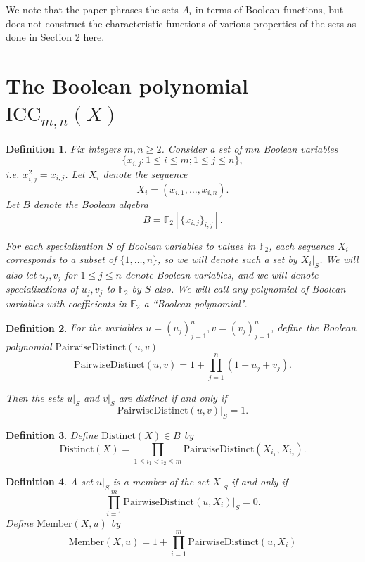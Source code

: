 \documentclass[11pt, oneside]{article}   	%
\newtheorem{definition}{Definition}
\begin{document}
We note that the paper \cite{Lozin} phrases the sets $A_i$ in terms of Boolean functions, but does not construct the characteristic functions of various properties of the sets as done in Section 2 here. 

\section{The Boolean polynomial $\mathrm{ICC}_{m,n}(X)$ }
\begin{definition} 
Fix integers $m,n \geq 2$. Consider a set of $mn$ Boolean variables $$\{x_{i,j} : 1 \leq i \leq m; 1 \leq j \leq n \},$$ i.e. $x_{i,j}^2 = x_{i,j}$. Let $X_i$ denote the sequence  
$$X_i = (x_{i,1}, \ldots, x_{i,n}).$$ 
Let $B$ denote the Boolean algebra $$B=\mathbb{F}_2[\{x_{i,j}\}_{i,j}] .$$


For each specialization $S$ of Boolean variables  to values in $\mathbb{F}_2$, each sequence $X_i$ corresponds to a subset of $\{ 1, \ldots, n\}$, so we will denote such a set by $X_i|_S$. We will also let $u_j, v_j$ for $1 \leq j  \leq n$ denote Boolean variables, and we will denote specializations of $u_j,v_j$ to $\mathbb{F}_2$ by $S$ also. We will call any polynomial of Boolean variables with coefficients in $\mathbb{F}_2$ a \emph{``Boolean polynomial"}. 
\end{definition} 

\begin{definition} For the variables $u=(u_j)_{j=1}^n, v=(v_j)_{j=1}^n$, define the Boolean polynomial $\mathrm{PairwiseDistinct}(u,v)$
$$
\mathrm{PairwiseDistinct}(u,v)=1+\prod_{j=1}^n (1+u_j+v_{j}).
$$

Then the sets $u|_S$ and $v|_S$ are distinct if and only if 
$$\mathrm{PairwiseDistinct}(u,v)|_S=1.$$

\end{definition} 

\begin{definition} 

Define $\mathrm{Distinct}(X)  \in B$ by
$$
\mathrm{Distinct}(X) =\prod_{1 \leq i_1<i_2 \leq m}\mathrm{PairwiseDistinct}(X_{i_1},X_{i_2}). 
$$
\end{definition} 

\begin{definition} 
A set $u|_S$ is a member of the set $X|_S$ if and only if 
$$
\prod_{i=1}^m \mathrm{PairwiseDistinct}(u,X_i)|_S = 0.
$$ 
Define $\mathrm{Member}(X,u)$ by 
$$
\mathrm{Member}(X,u) = 1+ \prod_{i=1}^m \mathrm{PairwiseDistinct}(u,X_i)
$$
\end{definition} 
\end{document}

